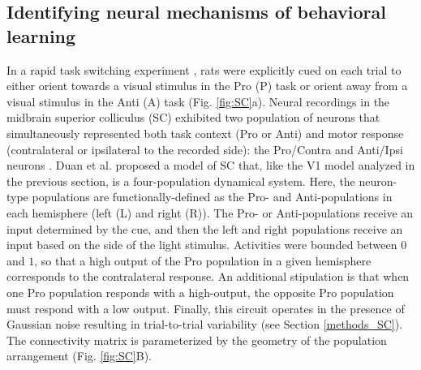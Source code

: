\documentclass[11pt]{article}
\begin{document}
\subsection{Identifying neural mechanisms of behavioral learning} \label{results_SC}
In a rapid task switching experiment \cite{duan2015requirement}, rats were explicitly cued on each trial to either orient towards a visual stimulus in the Pro (P) task or orient away from a visual stimulus in the Anti (A) task (Fig. \ref{fig:SC}a). Neural recordings in the midbrain superior colliculus (SC) exhibited two population of neurons that simultaneously represented both task context (Pro or Anti) and motor response (contralateral or ipsilateral to the recorded side): the Pro/Contra and Anti/Ipsi neurons \cite{duan2018collicular}.
Duan et al. proposed a model of SC that, like the V1 model analyzed in the previous section, is a four-population dynamical system.  
Here, the neuron-type populations are functionally-defined as the Pro- and Anti-populations in each hemisphere (left (L) and right (R)).  
The Pro- or Anti-populations receive an input determined by the cue, and then the left and right populations receive an input based on the side of the light stimulus. 
Activities were bounded between $0$ and $1$, so that a high output of the Pro population in a given hemisphere corresponds to the contralateral response.   
An additional stipulation is that when one Pro population responds with a high-output, the opposite Pro population must respond with a low output.
Finally, this circuit operates in the presence of Gaussian noise resulting in trial-to-trial variability (see Section \ref{methods_SC}).
The connectivity matrix is parameterized by the geometry of the population arrangement (Fig. \ref{fig:SC}B).  
\end{document}
